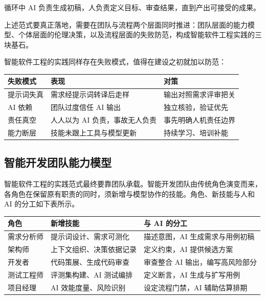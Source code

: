 \documentclass[
]{ctexbook}
\newcounter{none}
\begin{document}
循环中 AI 负责生成初稿，人负责定义目标、审查结果，直到产出可接受的成果。

上述范式要真正落地，需要在团队与流程两个层面同时推进：团队层面的能力模型、个体层面的伦理决策，以及流程层面的失败防范，构成智能软件工程实践的三块基石。

智能软件工程的实践同样存在失败模式，值得在建设之初就加以防范：

{\def\LTcaptype{none} %
\begin{longtable}[]{@{}lll@{}}
\toprule\noalign{}
失败模式 & 表现 & 对策 \\
\midrule\noalign{}
\endhead
\bottomrule\noalign{}
\endlastfoot
提示词失真 & 需求经提示词转译后走样 & 输出对照需求评审把关 \\
AI 依赖 & 团队过度信任 AI 输出 & 独立核验，验证优先 \\
责任真空 & 人人以为 AI 负责，事故无人负责 & 事先明确人机责任边界 \\
能力断层 & 技能未跟上工具与模型更新 & 持续学习、培训补能 \\
\end{longtable}
}

\subsection{智能开发团队能力模型}\label{ux667aux80fdux5f00ux53d1ux56e2ux961fux80fdux529bux6a21ux578b}

智能软件工程的实践范式最终要靠团队承载。智能开发团队由传统角色演变而来，各角色在保留原有职责的同时，须新增与模型协作的技能。角色、新技能与人和
AI 的分工如下表所示。

{\def\LTcaptype{none} %
\begin{longtable}[]{@{}
  >{\raggedright\arraybackslash}p{}
  >{\raggedright\arraybackslash}p{}
  >{\raggedright\arraybackslash}p{}@{}}
\toprule\noalign{}
\begin{minipage}[b]{\linewidth}\raggedright
角色
\end{minipage} & \begin{minipage}[b]{\linewidth}\raggedright
新增技能
\end{minipage} & \begin{minipage}[b]{\linewidth}\raggedright
与 AI 的分工
\end{minipage} \\
\midrule\noalign{}
\endhead
\bottomrule\noalign{}
\endlastfoot
需求分析师 & 提示词设计、需求可测化 & 描述意图，AI 生成需求与用例初稿 \\
架构师 & 上下文组织、决策依据记录 & 定义约束，AI 提供候选方案 \\
开发者 & 代码策展、生成代码审查 & 审查整合 AI 输出，编写高风险部分 \\
测试工程师 & 评测集构建、AI 测试编排 & 定义断言，AI 生成与扩写用例 \\
项目经理 & AI 效能度量、风险识别 & 设定流程门禁，AI 辅助估算排期 \\
\end{longtable}
}
\end{document}
